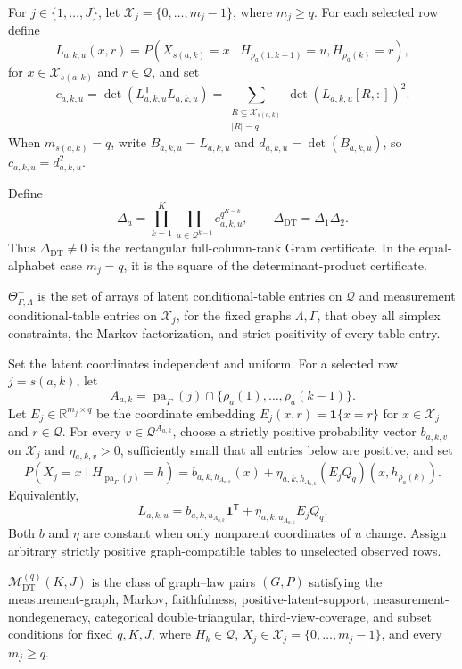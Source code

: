 For \(j\in\{1,\ldots,J\}\), let \(\mathcal X_j=\{0,\ldots,m_j-1\}\), where \(m_j\ge q\).  For each selected row define
\[
 L_{a,k,u}(x,r)
 =P\!\left(X_{s(a,k)}=x\mid
 H_{\rho_a(1:k-1)}=u,H_{\rho_a(k)}=r\right),
\]
for \(x\in\mathcal X_{s(a,k)}\) and \(r\in\mathcal Q\), and set
\[
 c_{a,k,u}=\det\!\left(L_{a,k,u}^{\mathsf T}L_{a,k,u}\right)
 =\sum_{\substack{R\subseteq\mathcal X_{s(a,k)}\\|R|=q}}
   \det\!\left(L_{a,k,u}[R,:]\right)^2.
\]
When \(m_{s(a,k)}=q\), write \(B_{a,k,u}=L_{a,k,u}\) and \(d_{a,k,u}=\det(B_{a,k,u})\), so \(c_{a,k,u}=d_{a,k,u}^2\).

Define
\[
 \Delta_a=\prod_{k=1}^K\prod_{u\in\mathcal Q^{k-1}}
 c_{a,k,u}^{q^{K-k}},
 \qquad
 \Delta_{\mathrm{DT}}=\Delta_1\Delta_2.
\]
Thus \(\Delta_{\mathrm{DT}}\neq0\) is the rectangular full-column-rank Gram certificate.  In the equal-alphabet case \(m_j=q\), it is the square of the determinant-product certificate.

\(\Theta_{\Gamma,\Lambda}^{+}\) is the set of arrays of latent conditional-table entries on \(\mathcal Q\) and measurement conditional-table entries on \(\mathcal X_j\), for the fixed graphs \(\Lambda,\Gamma\), that obey all simplex constraints, the Markov factorization, and strict positivity of every table entry.

Set the latent coordinates independent and uniform.  For a selected row \(j=s(a,k)\), let
\[
 A_{a,k}=\operatorname{pa}_{\Gamma}(j)
 \cap\{\rho_a(1),\ldots,\rho_a(k-1)\}.
\]
Let \(E_j\in\mathbb R^{m_j\times q}\) be the coordinate embedding \(E_j(x,r)=\mathbf1\{x=r\}\) for \(x\in\mathcal X_j\) and \(r\in\mathcal Q\).  For every \(v\in\mathcal Q^{A_{a,k}}\), choose a strictly positive probability vector \(b_{a,k,v}\) on \(\mathcal X_j\) and \(\eta_{a,k,v}>0\), sufficiently small that all entries below are positive, and set
\[
 P(X_j=x\mid H_{\operatorname{pa}_{\Gamma}(j)}=h)
 =b_{a,k,h_{A_{a,k}}}(x)
 +\eta_{a,k,h_{A_{a,k}}}
   \left(E_jQ_q\right)(x,h_{\rho_a(k)}).
\]
Equivalently,
\[
 L_{a,k,u}=b_{a,k,u_{A_{a,k}}}\mathbf1^{\mathsf T}
 +\eta_{a,k,u_{A_{a,k}}}E_jQ_q.
\]
Both \(b\) and \(\eta\) are constant when only nonparent coordinates of \(u\) change.  Assign arbitrary strictly positive graph-compatible tables to unselected observed rows.

\(\mathcal M_{\mathrm{DT}}^{(q)}(K,J)\) is the class of graph--law pairs \((G,P)\) satisfying the measurement-graph, Markov, faithfulness, positive-latent-support, measurement-nondegeneracy, categorical double-triangular, third-view-coverage, and subset conditions for fixed \(q,K,J\), where \(H_k\in\mathcal Q\), \(X_j\in\mathcal X_j=\{0,\ldots,m_j-1\}\), and every \(m_j\ge q\).


